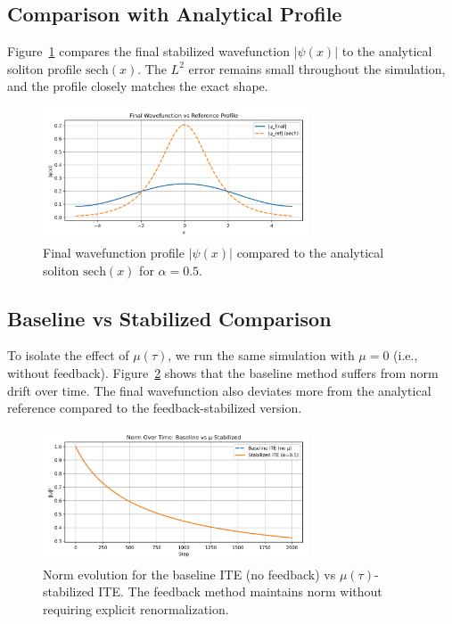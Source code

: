 \documentclass[12pt]{article}
\begin{document}
\subsection*{Comparison with Analytical Profile}

Figure~\ref{fig:final-sech} compares the final stabilized wavefunction $|\psi(x)|$ to the analytical soliton profile $\mathrm{sech}(x)$. The $L^2$ error remains small throughout the simulation, and the profile closely matches the exact shape.

\begin{figure}[h]
    \centering
    \includegraphics[width=0.7\textwidth]{figures/final_vs_sech.png}
    \caption{Final wavefunction profile $|\psi(x)|$ compared to the analytical soliton $\mathrm{sech}(x)$ for $\alpha = 0.5$.}
    \label{fig:final-sech}
\end{figure}

\subsection*{Baseline vs Stabilized Comparison}

To isolate the effect of $\mu(\tau)$, we run the same simulation with $\mu = 0$ (i.e., without feedback). Figure~\ref{fig:baseline} shows that the baseline method suffers from norm drift over time. The final wavefunction also deviates more from the analytical reference compared to the feedback-stabilized version.

\begin{figure}[h]
    \centering
    \includegraphics[width=0.7\textwidth]{figures/baseline_vs_mu.png}
    \caption{Norm evolution for the baseline ITE (no feedback) vs $\mu(\tau)$-stabilized ITE. The feedback method maintains norm without requiring explicit renormalization.}
    \label{fig:baseline}
\end{figure}
\end{document}
